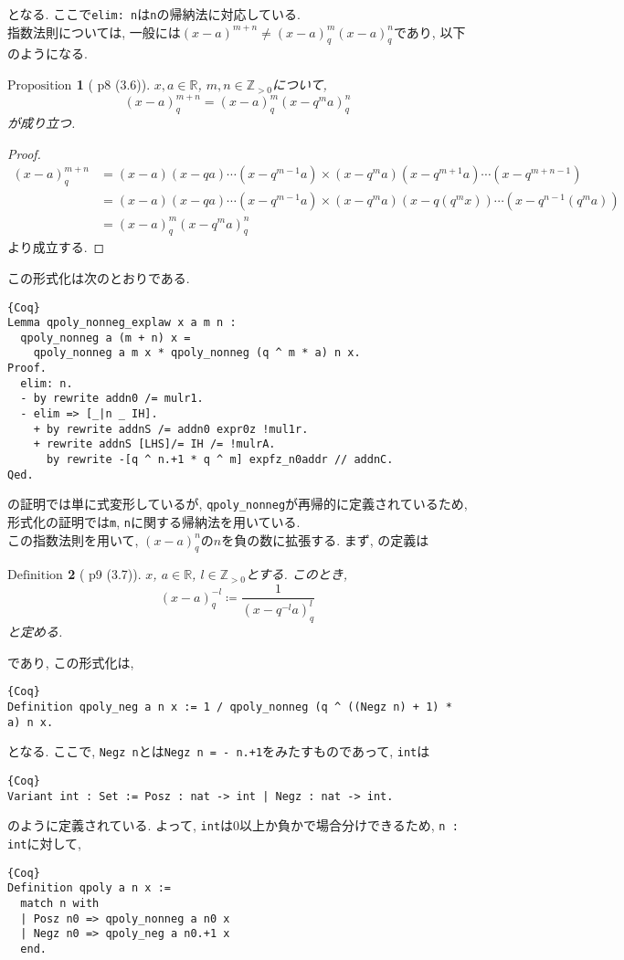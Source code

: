 \documentclass[11pt]{jarticle}
\theoremstyle{mystyle}
\newtheorem{df}{$\textrm{Definition}$}[subsection]
\newtheorem{prop}[df]{$\textrm{Proposition}$}
\newcommand{\bdf}{\begin{shadebox} \begin{df}}
\newcommand{\edf}{\end{df} \end{shadebox}}
\newcommand{\bprop}{\begin{shadebox} \begin{prop}}
\newcommand{\eprop}{\end{prop} \end{shadebox}}
\newcommand{\bpf}{\begin{proof}}
\newcommand{\epf}{\end{proof}}
\newcommand{\Z}{\mathbb{Z}}
\newcommand{\R}{\mathbb{R}}
\newcommand{\0}{\textbf{0}}
\newcommand{\1}{\textbf{1}}
\newcommand{\2}{\textbf{2}}
\begin{document}
となる. ここで{\tt elim:\,n}は{\tt n}の帰納法に対応している. \\
指数法則については, 一般には$(x - a)^{m + n} \neq (x - a)^m_q(x - a)^n_q$であり, 以下のようになる. 
\bprop[\cite{Kac} p8 (3.6)]
  $x,a\in\R$, $m,n\in\Z_{>0}$について, 
  \[
    (x-a)^{m+n}_q = (x-a)^m_q (x-q^ma)^n_q
  \]
  が成り立つ. 
\eprop
\bpf
    \begin{align*}
    (x-a)^{m+n}_q &= (x-a)(x-qa)\cdots(x-q^{m-1}a)
                         \times (x-q^ma)(x-q^{m+1}a)\cdots(x-q^{m+n-1})\\
                       &= (x-a)(x-qa)\cdots(x-q^{m-1}a)
                         \times (x-q^ma)(x-q(q^mx))\cdots(x-q^{n-1}(q^ma))\\
                       &= (x-a)^m_q(x-q^ma)^{n}_q
  \end{align*}
  より成立する.
\epf
この形式化は次のとおりである. 
\begin{lstlisting}{Coq}
Lemma qpoly_nonneg_explaw x a m n :
  qpoly_nonneg a (m + n) x =
    qpoly_nonneg a m x * qpoly_nonneg (q ^ m * a) n x.
Proof.
  elim: n.
  - by rewrite addn0 /= mulr1.
  - elim => [_|n _ IH].
    + by rewrite addnS /= addn0 expr0z !mul1r.
    + rewrite addnS [LHS]/= IH /= !mulrA.
      by rewrite -[q ^ n.+1 * q ^ m] expfz_n0addr // addnC.
Qed.
\end{lstlisting}
\cite{Kac}の証明では単に式変形しているが, {\tt qpoly\_nonneg}が再帰的に定義されているため, 形式化の証明では{\tt m}, {\tt n}に関する帰納法を用いている. \\
この指数法則を用いて, $(x - a)^n_q$の$n$を負の数に拡張する. まず, \cite{Kac}の定義は
\bdf[\cite{Kac} p9 (3.7)] \label{qpoly_neg}
  $x$, $a \in \R$, $l\in\Z_{>0}$とする. このとき, 
  \[
    (x-a)^{-l}_q \coloneqq \frac{1}{(x-q^{-l}a)^l_q}
  \]
  と定める. 
\edf
であり, この形式化は, 
\begin{lstlisting}{Coq}
Definition qpoly_neg a n x := 1 / qpoly_nonneg (q ^ ((Negz n) + 1) * a) n x.
\end{lstlisting}
となる. ここで, {\tt Negz n}とは{\tt Negz n = - n.+1}をみたすものであって, {\tt int}は
\begin{lstlisting}{Coq}
Variant int : Set := Posz : nat -> int | Negz : nat -> int.
\end{lstlisting}
のように定義されている. よって, {\tt int}は$0$以上か負かで場合分けできるため, {\tt n :\,int}に対して, 
\begin{lstlisting}{Coq}
Definition qpoly a n x :=
  match n with
  | Posz n0 => qpoly_nonneg a n0 x
  | Negz n0 => qpoly_neg a n0.+1 x
  end.
\end{lstlisting}
\end{document}
